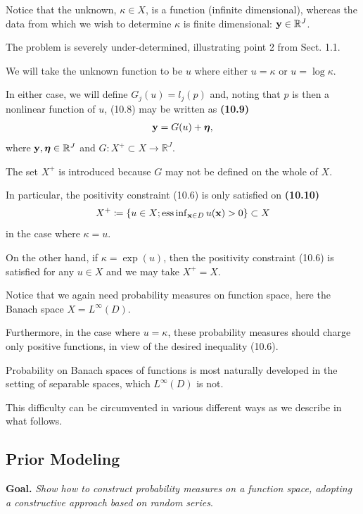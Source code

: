 \documentclass[oneside]{article}
\numberwithin{equation}{section}
\begin{document}
%
Notice that the unknown, $\kappa\in X$, is a function (infinite dimensional), whereas the data from which we wish to determine $\kappa$ is finite dimensional: ${\bf y}\in\mathbb{R}^J$.

The problem is severely under-determined, illustrating point 2 from Sect. 1.1.


We will take the unknown function to be $u$ where either $u = \kappa$ or $u = \log\kappa$.

In either case, we will define $G_j(u) = l_j(p)$ and, noting that $p$ is then a nonlinear function of $u$, (10.8) may be written as \textbf{(10.9)}
\begin{align*}
    {\bf y} = G(u) + \boldsymbol{\eta},
\end{align*}
where ${\bf y},\boldsymbol{\eta}\in\mathbb{R}^J$ and $G:X^+\subset X\to\mathbb{R}^J$.

The set $X^+$ is introduced because $G$ may not be defined on the whole of $X$.

In particular, the positivity constraint (10.6) is only satisfied on \textbf{(10.10)}
\begin{align*}
    X^+\coloneqq\left\{u\in X;\operatorname{ess\inf}_{{\bf x}\in D} u({\bf x}) > 0\right\}\subset X
\end{align*}
in the case where $\kappa = u$.

On the other hand, if $\kappa = \exp(u)$, then the positivity constraint (10.6) is satisfied for any $u\in X$ and we may take $X^+ = X$.

%
Notice that we again need probability measures on function space, here the Banach space $X = L^\infty(D)$.

Furthermore, in the case where $u = \kappa$, these probability measures should charge only positive functions, in view of the desired inequality (10.6).

Probability on Banach spaces of functions is most naturally developed in the setting of separable spaces, which $L^\infty(D)$ is not.

This difficulty can be circumvented in various different ways as we describe in what follows.

\subsection{Prior Modeling}
\textbf{Goal.} \textit{Show how to construct probability measures on a function space, adopting a constructive approach based on random series}.
\end{document}
